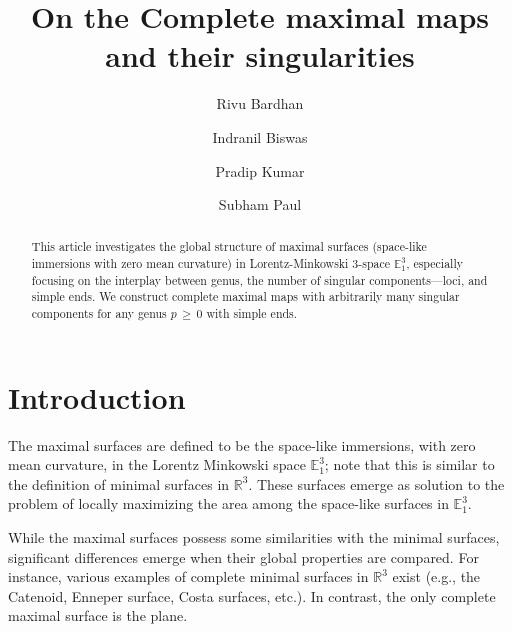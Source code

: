\documentclass[12pt]{amsart}
\date{}
\numberwithin{equation}{section}
\begin{document}
\title[Complete maximal maps and their singularities]{On the Complete maximal maps and
their singularities}

\author[R. Bardhan]{Rivu Bardhan}
\address{Department of Mathematics, Shiv Nadar University, Dadri 201314, Uttar Pradesh, India.}

\author[I. Biswas]{Indranil Biswas}
\address{Department of Mathematics, Shiv Nadar University, Dadri 201314, Uttar Pradesh, India.}

\author[P. Kumar]{Pradip Kumar}
\address{Department of Mathematics, Shiv Nadar University, Dadri 201314, Uttar Pradesh, India.}

\author[S. Paul]{Subham Paul}
\address{Department of Mathematics, Indian Institute of Technology Patna, Bihta 801106, Bihar, India.}

\date{}



\begin{abstract}
This article investigates the global structure of maximal surfaces (space-like immersions with zero mean 
curvature) in Lorentz-Minkowski $3$-space \(\mathbb{E}^3_1\), especially focusing on the interplay between 
genus, the number 
of singular components—loci, and simple ends. We construct complete maximal maps with arbitrarily many 
singular components for any genus \(p\,\geq\, 0\) with simple ends.
\end{abstract}
\maketitle


\section{Introduction}

The maximal surfaces are defined to be the space-like 
immersions, with zero mean curvature, in the Lorentz Minkowski space $\mathbb{E}_1^3$;
note that this is similar to the definition of minimal surfaces in $\mathbb{R}^3$. These surfaces emerge as 
solution to the problem of locally maximizing the area among the space-like surfaces in $\mathbb{E}_1^3$.

While the maximal surfaces possess some similarities with the minimal surfaces, significant differences
emerge when their global properties are compared. For instance, various examples of complete minimal surfaces
in $\mathbb{R}^3$ exist 
(e.g., the Catenoid, Enneper surface, Costa surfaces, etc.). In contrast, the only complete maximal surface
is the plane.
\end{document}
